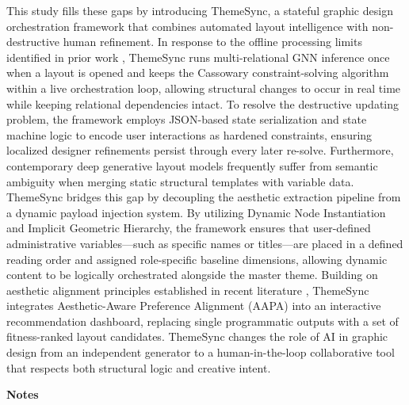 \begin{refsection}
This study fills these gaps by introducing ThemeSync, a stateful graphic design orchestration framework that combines automated layout intelligence with non-destructive human refinement. In response to the offline processing limits identified in prior work \cite{Shi2023Survey}, ThemeSync runs multi-relational GNN inference once when a layout is opened and keeps the Cassowary constraint-solving algorithm within a live orchestration loop, allowing structural changes to occur in real time while keeping relational dependencies intact. To resolve the destructive updating problem, the framework employs JSON-based state serialization and state machine logic to encode user interactions as hardened constraints, ensuring localized designer refinements persist through every later re-solve. Furthermore, contemporary deep generative layout models frequently suffer from semantic ambiguity when merging static structural templates with variable data. ThemeSync bridges this gap by decoupling the aesthetic extraction pipeline from a dynamic payload injection system. By utilizing Dynamic Node Instantiation and Implicit Geometric Hierarchy, the framework ensures that user-defined administrative variables—such as specific names or titles—are placed in a defined reading order and assigned role-specific baseline dimensions, allowing dynamic content to be logically orchestrated alongside the master theme. Building on aesthetic alignment principles established in recent literature \cite{Patnaik2025AesthetiQ}, ThemeSync integrates Aesthetic-Aware Preference Alignment (AAPA) into an interactive recommendation dashboard, replacing single programmatic outputs with a set of fitness-ranked layout candidates. ThemeSync changes the role of AI in graphic design from an independent generator to a human-in-the-loop collaborative tool that respects both structural logic and creative intent.





\clearpage

\begin{center}
\textbf{Notes}
\end{center}
\printbibliography[heading=none]
\end{refsection}